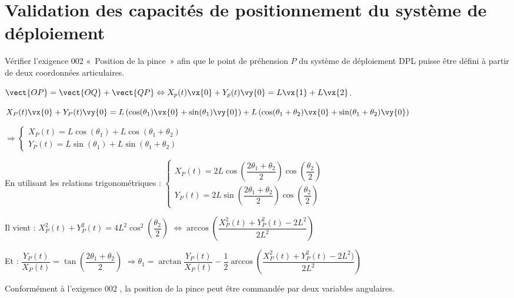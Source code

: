 \section{Validation des capacités de positionnement du système de déploiement}

\begin{obj}
Vérifier l’exigence 002 «~Position de la pince~» afin que le point de préhension $P$ du 
système de déploiement DPL puisse être défini à partir de deux coordonnées articulaires.
\end{obj}

\ifprof
\begin{corrige}%
$\vect{OP}=\vect{OQ}+\vect{QP} \Leftrightarrow X_p(t) \vx{0} + Y_p(t) \vy{0} =L\vx{1}+L\vx{2}$.
\end{corrige}
\else
\fi

\ifprof
\begin{corrige}%
$X_P(t)\vx{0}+Y_P(t)\vy{0}=L\left(\cos(\theta_1)\vx{0}+\sin(\theta_1)\vy{0}\right)+L\left(\cos(\theta_1+\theta_2)\vx{0}+\sin(\theta_1+\theta_2)\vy{0}\right)$

$\Rightarrow 
\left\{
\begin{array}{l}
X_P(t)=L\cos(\theta_1)+L\cos(\theta_1+\theta_2) \\
Y_P(t)=L\sin(\theta_1)+L\sin(\theta_1+\theta_2) 
\end{array}
\right.$


\end{corrige}
\else
\fi


\ifprof
\begin{corrige}%
En utilisant les relations trigonométriques : 
$\left\{
\begin{array}{l}
X_P(t)=2L \cos\left(\dfrac{2\theta_1 + \theta_2}{2}\right) \cos
\left(\dfrac{\theta_2}{2}\right) \\
Y_P(t)=2L \sin\left(\dfrac{2\theta_1 + \theta_2}{2}\right) \cos
\left(\dfrac{\theta_2}{2}\right) 
\end{array}
\right.
$

Il vient : 
$X_P^2 (t)+Y_P^2 (t)=4L^2 \cos^2 \left(\dfrac{\theta_2}{2}\right)$ 
$\Leftrightarrow 
\arccos 
\left( 
\dfrac{X_P^2 (t)+Y_P^2 (t)-2L^2}{2L^2}
\right)$

Et : $\dfrac{Y_P(t)}{X_P(t)} =\tan\left(\dfrac{2\theta_1 + \theta_2}{2}\right)$ 
$ \Rightarrow \theta_1 = \arctan \dfrac{Y_P(t)}{X_P(t)} -\dfrac{1}{2} \arccos\left(\dfrac{X_P^2 (t)+Y_P^2 (t)-2L^2)}{2L^2}\right)$

Conformément à l'exigence 002 , la position de la pince peut être commandée par deux variables angulaires.
\end{corrige}
\else
\fi

